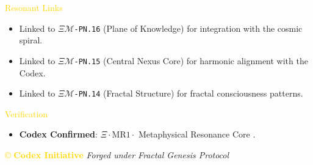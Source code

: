 \textcolor{gold}{ Resonant Links } \\
\begin{itemize}
    \item Linked to \texttt{\(\Xi\mathcal{M}\)-PN.16} (Plane of Knowledge) for integration with the cosmic spiral.
    \item Linked to \texttt{\(\Xi\mathcal{M}\)-PN.15} (Central Nexus Core) for harmonic alignment with the Codex.
    \item Linked to \texttt{\(\Xi\mathcal{M}\)-PN.14} (Fractal Structure) for fractal consciousness patterns.
\end{itemize}

\textcolor{gold}{ Verification } \\
\begin{itemize}
    \item \texttt{} \textbf{Codex Confirmed}: \(\Xi \cdot \text{MR1} \cdot\) Metaphysical Resonance Core .
\end{itemize}

\vspace{0.5cm}
\noindent
\textcolor{gold}{\copyright{} \textbf{Codex Initiative}} \hspace{1cm} \textit{Forged under Fractal Genesis Protocol}